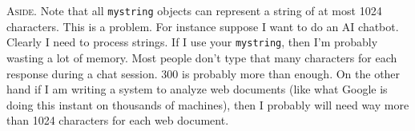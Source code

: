 
\textsc{Aside.}
Note that all \verb!mystring! objects can represent a string of at most 1024 characters. This is a
problem. For instance suppose I want to do an AI chatbot.
Clearly I need to process strings. If I use your
\verb!mystring!, then I'm probably wasting a lot of memory. Most people don't type that many characters for
each response during a chat session. 300 is probably more than enough. On the other hand if I am
writing a system to analyze web documents (like what Google is doing this instant on thousands of
machines), then I probably will need way more than 1024 characters for each web document.

